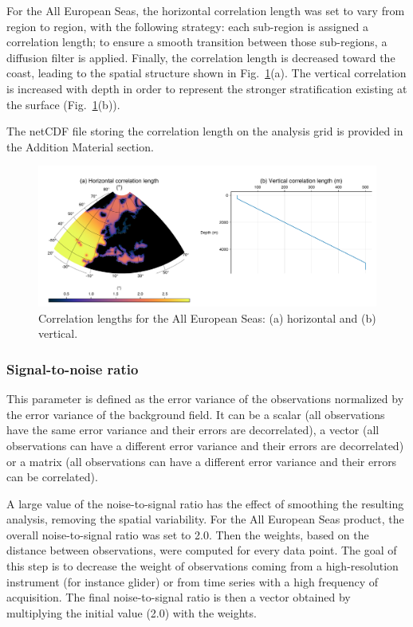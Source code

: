 \documentclass[essd,manuscript]{copernicus}
\begin{document}
For the All European Seas, the horizontal correlation length was set to vary from region to region, with the following strategy: each sub-region is assigned a correlation length; to ensure a smooth transition between those sub-regions, a diffusion filter is applied. Finally, the correlation length is decreased toward the coast, leading to the spatial structure shown in Fig.~\ref{fig:correlation_length}(a). The vertical correlation is increased with depth in order to represent the stronger stratification existing at the surface (Fig.~\ref{fig:correlation_length}(b)).

The netCDF file storing the correlation length on the analysis grid is provided in the Addition Material section.

\begin{figure}[t]
\centering
\includegraphics[width=\textwidth]{correlation_length.pdf}
\caption{Correlation lengths for the All European Seas: (a) horizontal and (b) vertical.\label{fig:correlation_length}}
\end{figure}

\subsubsection{Signal-to-noise ratio}

This parameter is defined as the error variance of the observations normalized by the error variance of the background field. It can be a scalar (all observations have the same error variance and their errors are decorrelated), a vector (all observations can have a different error variance and their errors are decorrelated) or a matrix (all observations can have a different error variance and their errors can be correlated). 

A large value of the noise-to-signal ratio has the effect of smoothing the resulting analysis, removing the spatial variability. For the All European Seas product, the overall noise-to-signal ratio was set to 2.0. Then the weights, based on the distance between observations, were computed for every data point. The goal of this step is to decrease the weight of observations coming from a high-resolution instrument (for instance glider) or from time series with a high frequency of acquisition. The final noise-to-signal ratio is then a vector obtained by multiplying the initial value (2.0) with the weights.
\end{document}
